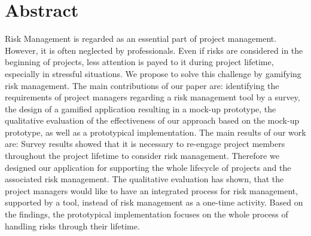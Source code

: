 
{\let\clearpage\relax\chapter*{Abstract}}

Risk Management is regarded as an essential part of project management. However, it is often neglected by professionals. Even if risks are considered in the beginning of projects, less attention is payed to it during project lifetime, especially in stressful situations. 
We propose to solve this challenge by gamifying risk management. 
The main contributions of our paper are:
identifying the requirements of project managers regarding a risk management tool by a survey, the design of a gamified application resulting in a mock-up prototype, the qualitative evaluation of the effectiveness of our approach based on the mock-up prototype, as well as a prototypical implementation. 
The main results of our work are:
Survey results showed that it is necessary to re-engage project members throughout the project lifetime to consider risk management. Therefore we designed our application for supporting the whole lifecycle of projects and the associated risk management. The qualitative evaluation has shown, that the project managers would like to have an integrated process for risk management, supported by a tool, instead of risk management as a one-time activity. Based on the findings, the prototypical implementation focuses on the whole process of handling risks through their lifetime.